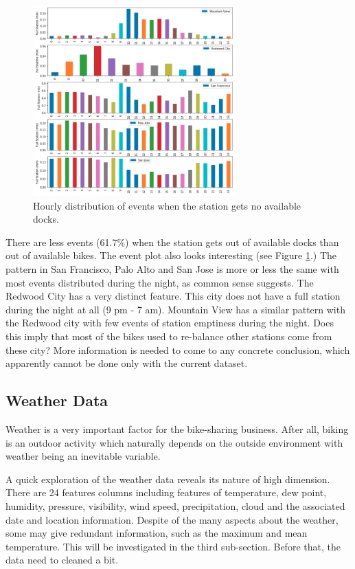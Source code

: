 \documentclass[a4paper]{article}
\begin{document}
			\begin{figure}
				\centering
				\includegraphics[width=0.7\textwidth]{StationFull.png}
				\caption{\label{fig:full_station}Hourly distribution of events when the station gets no available docks.}
			\end{figure}			
		 
			 There are less events (61.7\%) when the station gets out of available docks than out of available bikes. The event plot also looks interesting (see Figure \ref{fig:full_station}.) The pattern in San Francisco, Palo Alto and San Jose is more or less the same with most events distributed during the night, as common sense suggests. The Redwood City has a very distinct feature. This city does not have a full station during the night at all (9 pm - 7 am). Mountain View has a similar pattern with the Redwood city with few events of station emptiness during the night. Does this imply that most of the bikes used to re-balance other stations come from these city? More information is needed to come to any concrete conclusion, which apparently cannot be done only with the current dataset.
		
		\subsection{Weather Data}
		Weather is a very important factor for the bike-sharing business. After all, biking is an outdoor activity which naturally depends on the outside environment with weather being an inevitable variable. 
		
		A quick exploration of the weather data reveals its nature of high dimension. There are 24 features columns including features of temperature, dew point, humidity, pressure, visibility, wind speed, precipitation, cloud and the associated date and location information. Despite of the many aspects about the weather, some may give redundant information, such as the maximum and mean temperature. This will be investigated in the third sub-section. Before that, the data need to cleaned a bit.		
		
\end{document}
